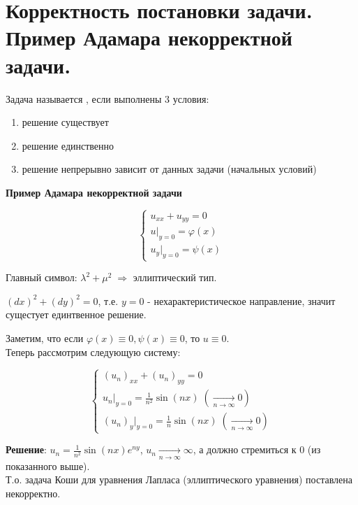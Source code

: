 \chapter{Корректность постановки задачи. Пример Адамара некорректной задачи.}
\label{cha:3}

\begin{definition}\label{cha:3/def:1}
	Задача называется , если выполнены 3 условия:
	\begin{enumerate}
		\item решение существует
		\item решение единственно
		\item решение непрерывно зависит от данных задачи (начальных условий)
	\end{enumerate}
\end{definition}

\textbf{Пример Адамара некорректной задачи}

$$\begin{cases}
	u_{xx} + u_{yy} = 0 \\
	u|_{y=0} = \varphi (x) \\
	u_{y}|_{y=0} = \psi (x)
\end{cases}$$

Главный символ: $\lambda^2 + \mu^2 \; \Rightarrow$ эллиптический тип.

$(dx)^2 + (dy)^2 = 0$, т.е. $y = 0$ - нехарактеристическое направление, значит сущестует единтвенное решение.

Заметим, что если $\varphi (x) \equiv 0, \psi (x) \equiv 0$, то $u \equiv 0$.\\

Теперь рассмотрим следующую систему:

$$\begin{cases}
	(u_n)_{xx} + (u_n)_{yy} = 0 \\
	u_n|_{y=0} = \frac{1}{n^2} \sin{(nx)} \; (\xrightarrow[n \to \infty]{} 0) \\
	(u_n)_y|_{y=0} = \frac{1}{n} \sin{(nx)} \; (\xrightarrow[n \to \infty]{} 0)
\end{cases}$$

\textbf{Решение}: $u_n = \frac{1}{n^2} \sin{(nx)} e^{n y}$, $u_n \xrightarrow[n \to \infty]{} \infty$, а должно стремиться к 0 (из показанного выше).\\

Т.о. задача Коши для уравнения Лапласа (эллиптического уравнения) поставлена некорректно. 

